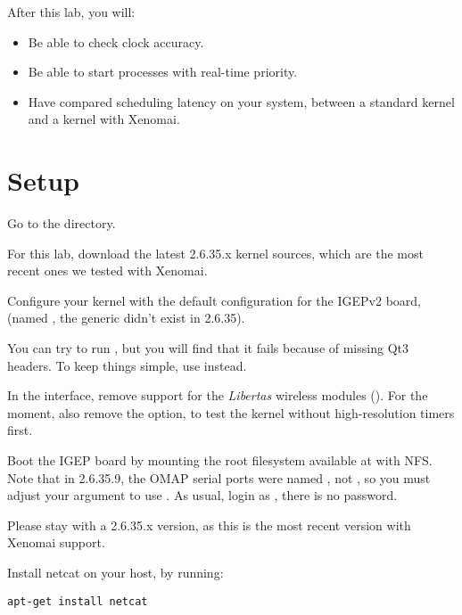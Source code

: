 
After this lab, you will:
\begin{itemize}
\item Be able to check clock accuracy.
\item Be able to start processes with real-time priority.
\item Have compared scheduling latency on your system, between a standard kernel and a kernel with Xenomai.
\end{itemize}

\section{Setup}

Go to the  directory.

For this lab, download the latest 2.6.35.x kernel sources, which 
are the most recent ones we tested with Xenomai.

Configure your kernel with the default configuration for the IGEPv2
board, (named , the generic 
didn't exist in 2.6.35).

You can try to run , but you will find that
it fails because of missing Qt3 headers. To keep things simple, use 
 instead. 

In the  interface, remove support for the 
{\em Libertas} wireless modules (). 
For the moment, also remove the 
option, to test the kernel without high-resolution timers first.

Boot the IGEP board by mounting the root filesystem available at
 with NFS. Note
that in 2.6.35.9, the OMAP serial ports were named , not
, so you must adjust your  argument to use
. As usual, login as , there is no password.

Please stay with a 2.6.35.x version, as this is the most recent
version with Xenomai support.

Install netcat on your host, by running:
\begin{verbatim}
apt-get install netcat
\end{verbatim}

